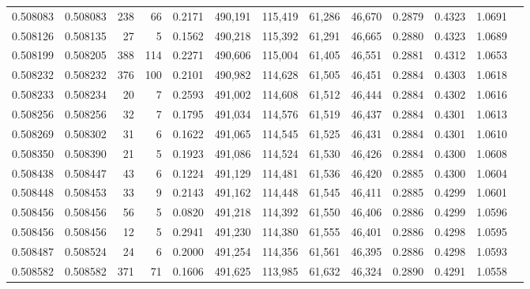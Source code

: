 \begin{tabular}{rrrrrrrrrrrrr}
0.508083 & 0.508083 &   238 &    66 &                                     0.2171 & 490,191 & 115,419 &  61,286 &  46,670 & 0.2879 & 0.4323 & 1.0691 \\
0.508126 & 0.508135 &    27 &     5 &                                     0.1562 & 490,218 & 115,392 &  61,291 &  46,665 & 0.2880 & 0.4323 & 1.0689 \\
0.508199 & 0.508205 &   388 &   114 &                                     0.2271 & 490,606 & 115,004 &  61,405 &  46,551 & 0.2881 & 0.4312 & 1.0653 \\
0.508232 & 0.508232 &   376 &   100 &                                     0.2101 & 490,982 & 114,628 &  61,505 &  46,451 & 0.2884 & 0.4303 & 1.0618 \\
0.508233 & 0.508234 &    20 &     7 &                                     0.2593 & 491,002 & 114,608 &  61,512 &  46,444 & 0.2884 & 0.4302 & 1.0616 \\
0.508256 & 0.508256 &    32 &     7 &                                     0.1795 & 491,034 & 114,576 &  61,519 &  46,437 & 0.2884 & 0.4301 & 1.0613 \\
0.508269 & 0.508302 &    31 &     6 &                                     0.1622 & 491,065 & 114,545 &  61,525 &  46,431 & 0.2884 & 0.4301 & 1.0610 \\
0.508350 & 0.508390 &    21 &     5 &                                     0.1923 & 491,086 & 114,524 &  61,530 &  46,426 & 0.2884 & 0.4300 & 1.0608 \\
0.508438 & 0.508447 &    43 &     6 &                                     0.1224 & 491,129 & 114,481 &  61,536 &  46,420 & 0.2885 & 0.4300 & 1.0604 \\
0.508448 & 0.508453 &    33 &     9 &                                     0.2143 & 491,162 & 114,448 &  61,545 &  46,411 & 0.2885 & 0.4299 & 1.0601 \\
0.508456 & 0.508456 &    56 &     5 &                                     0.0820 & 491,218 & 114,392 &  61,550 &  46,406 & 0.2886 & 0.4299 & 1.0596 \\
0.508456 & 0.508456 &    12 &     5 &                                     0.2941 & 491,230 & 114,380 &  61,555 &  46,401 & 0.2886 & 0.4298 & 1.0595 \\
0.508487 & 0.508524 &    24 &     6 &                                     0.2000 & 491,254 & 114,356 &  61,561 &  46,395 & 0.2886 & 0.4298 & 1.0593 \\
0.508582 & 0.508582 &   371 &    71 &                                     0.1606 & 491,625 & 113,985 &  61,632 &  46,324 & 0.2890 & 0.4291 & 1.0558 \\

\end{tabular}

